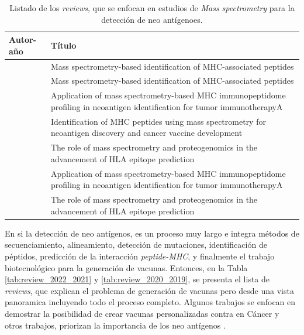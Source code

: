 \begin{table}[H]
	\caption{Listado de los \textit{reviews}, que se enfocan en estudios de \textit{Mass spectrometry} para la detección de neo antígenoes.}
	\label{tab:review_ms}
	\begin{tabular}{p{3cm}p{10cm}}
	\textbf{Autor-año }                            & \textbf{Título}                                                                                                                                 \\ \hline
		\cite{kote2020mass}           & Mass spectrometry-based identification of MHC-associated peptides                                                          \\
		\cite{kote2020mass}           & Mass spectrometry-based identification of MHC-associated peptides                                                          \\
		\cite{zhang2019application}   & Application of mass spectrometry-based MHC immunopeptidome profiling in neoantigen identification for tumor immunotherapyA \\
		\cite{chen2021identification} & Identification of MHC peptides using mass spectrometry for neoantigen discovery and cancer vaccine development             \\
		\cite{creech2018role}         & The role of mass spectrometry and proteogenomics in the advancement of HLA epitope prediction                              \\
		\cite{zhang2019application}   & Application of mass spectrometry-based MHC immunopeptidome profiling in neoantigen identification for tumor immunotherapyA \\
		\cite{creech2018role}         & The role of mass spectrometry and proteogenomics in the advancement of HLA epitope prediction                             
	\end{tabular}
\end{table}


En si la detección de neo antígenos, es un proceso muy largo e integra métodos de secuenciamiento, alineamiento, detección de mutaciones, identificación de péptidos, predicción de la interacción \textit{peptide-MHC}, y finalmente el trabajo biotecnológico para la generación de vacunas. Entonces, en la Tabla \ref{tab:review_2022_2021} y \ref{tab:review_2020_2019}, se presenta el lista de \textit{reviews}, que explican el problema de generación de vacunas pero desde una vista panoramica incluyendo todo el proceso completo. Algunos trabajos se enfocan en demostrar la posibilidad de crear vacunas personalizadas contra en Cáncer \citep{lang2022identification, richard2022neoantigen, pao2022therapeutic, reynolds2022neoantigen, mccaffrey2022bioinformatic, fritsch2020personal} y otros trabajos, priorizan la importancia de los neo antígenos \citep{okada2022identification, zheng2022neoantigen, wang2021gene, pearlman2021targeting, arnaud2020biotechnologies, han2020progress}.


